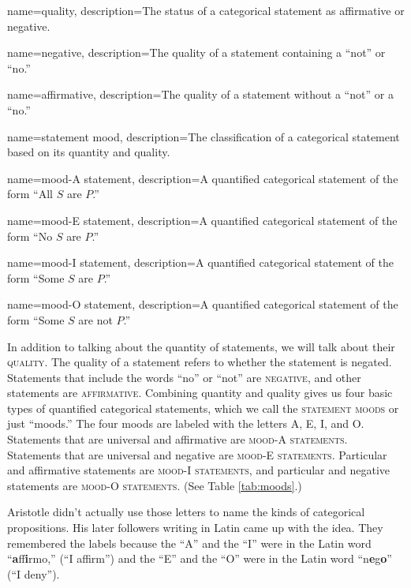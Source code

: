 {
name=quality,
description={The status of a categorical statement as affirmative or negative.}
}

{
name=negative,
description={The quality of a statement containing a ``not'' or ``no.''}
}

{
name=affirmative,
description={The quality of a statement without a ``not'' or a ``no.''}
}



{
name=statement mood,
description={The classification of a categorical statement based on its quantity and quality.}
}

{
name=mood-A statement,
description={A quantified categorical statement of the form ``All $S$ are $P$.''}
}

{
name=mood-E statement,
description={A quantified categorical statement of the form ``No $S$ are $P$.''}
}

{
name=mood-I statement,
description={A quantified categorical statement of the form ``Some $S$ are $P$.''}
}

{
name=mood-O statement,
description={A quantified categorical statement of the form ``Some $S$ are not $P$.''}
}



In addition to talking about the quantity of statements, we will talk about their \textsc{\gls{quality}}. \label{defQuality} The quality of a statement refers to whether the statement is negated. Statements that include the words ``no'' or ``not'' are \textsc{\gls{negative}}, and other statements are \textsc{\gls{affirmative}}. Combining quantity and quality gives us four basic types of quantified categorical statements, which we call the \textsc{\glspl{statement mood}} or just ``moods.'' The four moods are labeled with the letters A, E, I, and O. Statements that are universal and affirmative are \textsc{\glspl{mood-A statement}}. Statements that are universal and negative are \textsc{\glspl{mood-E statement}}. Particular and affirmative statements are \textsc{\glspl{mood-I statement}}, and particular and negative statements are \textsc{\glspl{mood-O statement}}. (See Table \ref{tab:moods}.)


Aristotle didn't actually use those letters to name the kinds of categorical propositions. His later followers writing in Latin came up with the idea. They remembered the labels because the ``A'' and the ``I'' were in the Latin word ``\textbf{a}ff\textbf{i}rmo,'' (``I affirm'') and the ``E'' and the ``O'' were in the Latin word ``n\textbf{e}g\textbf{o}'' (``I deny''). 

